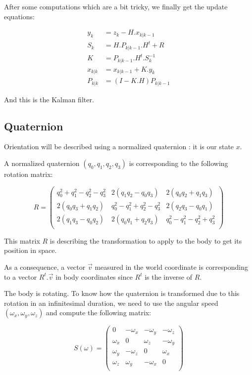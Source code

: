 \documentclass[titlepage,a4,12pt]{article}
\numberwithin{equation}{subsection}
\newcommand{\before}[1]{#1_{k|k-1}}
\newcommand{\after}[1]{#1_{k|k}}
\begin{document}
After some computations which are a bit tricky, we finally get the update equations:

\begin{align}
y_k &= z_k - H . \before{x} \\
S_k &= H . \before{P} . H^t + R \\ 
K &= \before{P} . H^t . S_k^{-1} \\ 
\after{x} &= \before{x} + K . y_k \\ 
\after{P} &= (I - K . H) \before{P}
\end{align}

And this is the Kalman filter.

\subsection{Quaternion}

Orientation will be described using a normalized quaternion : it is our state $x$.

A normalized quaternion $(q_0,q_1,q_2,q_3)$ is corresponding to the following rotation matrix:

\begin{equation}\label{eq:quattorot}
R = \left(
\begin{array}{ccc}
 q_0^2+q_1^2-q_2^2-q_3^2 & 2 (q_1 q_2-q_0 q_3) & 2 (q_0 q_2+q_1 q_3) \\
 2 (q_0 q_3+q_1 q_2) & q_0^2-q_1^2+q_2^2-q_3^2 & 2 (q_2 q_3-q_0 q_1) \\
 2 (q_1 q_3-q_0 q_2) & 2 (q_0 q_1+q_2 q_3) & q_0^2-q_1^2-q_2^2+q_3^2 \\
\end{array}
\right)
\end{equation}

This matrix $R$ is describing the transformation to apply to the body to get its position in space.

As a consequence, a vector $\overrightarrow{v}$ measured in the world coordinate is corresponding to a vector $R^t . \overrightarrow{v}$ in body coordinates since $R^t$ is the inverse of $R$.

The body is rotating. To know how the quaternion is transformed due to this rotation in an infinitesimal duration, we need to use the angular speed $(\omega_x, \omega_y, \omega_z)$ and compute the following matrix:

\begin{equation}\label{eq:quatrot}
S(\omega) = \left(
\begin{array}{cccc}
 0 & -\omega_x & -\omega_y & -\omega_z \\
 {\omega_x} & 0 & {\omega_z} & -{\omega_y} \\
 {\omega_y} & -{\omega_z} & 0 & {\omega_x} \\
 {\omega_z} & {\omega_y} & -{\omega_x} & 0 \\
\end{array}
\right)
\end{equation}
\end{document}
